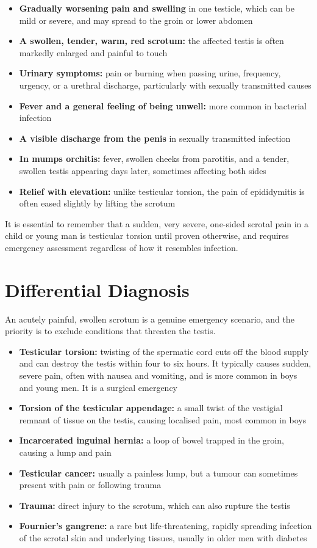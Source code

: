 \begin{itemize}
    \item \textbf{Gradually worsening pain and swelling} in one testicle, which can be mild or severe, and may spread to the groin or lower abdomen
    \item \textbf{A swollen, tender, warm, red scrotum:} the affected testis is often markedly enlarged and painful to touch
    \item \textbf{Urinary symptoms:} pain or burning when passing urine, frequency, urgency, or a urethral discharge, particularly with sexually transmitted causes
    \item \textbf{Fever and a general feeling of being unwell:} more common in bacterial infection
    \item \textbf{A visible discharge from the penis} in sexually transmitted infection
    \item \textbf{In mumps orchitis:} fever, swollen cheeks from parotitis, and a tender, swollen testis appearing days later, sometimes affecting both sides
    \item \textbf{Relief with elevation:} unlike testicular torsion, the pain of epididymitis is often eased slightly by lifting the scrotum
\end{itemize}

It is essential to remember that a sudden, very severe, one-sided scrotal pain in a child or young man is testicular torsion until proven otherwise, and requires emergency assessment regardless of how it resembles infection.

\section*{Differential Diagnosis}
An acutely painful, swollen scrotum is a genuine emergency scenario, and the priority is to exclude conditions that threaten the testis.

\begin{itemize}
    \item \textbf{Testicular torsion:} twisting of the spermatic cord cuts off the blood supply and can destroy the testis within four to six hours. It typically causes sudden, severe pain, often with nausea and vomiting, and is more common in boys and young men. It is a surgical emergency
    \item \textbf{Torsion of the testicular appendage:} a small twist of the vestigial remnant of tissue on the testis, causing localised pain, most common in boys
    \item \textbf{Incarcerated inguinal hernia:} a loop of bowel trapped in the groin, causing a lump and pain
    \item \textbf{Testicular cancer:} usually a painless lump, but a tumour can sometimes present with pain or following trauma
    \item \textbf{Trauma:} direct injury to the scrotum, which can also rupture the testis
    \item \textbf{Fournier's gangrene:} a rare but life-threatening, rapidly spreading infection of the scrotal skin and underlying tissues, usually in older men with diabetes
\end{itemize}

